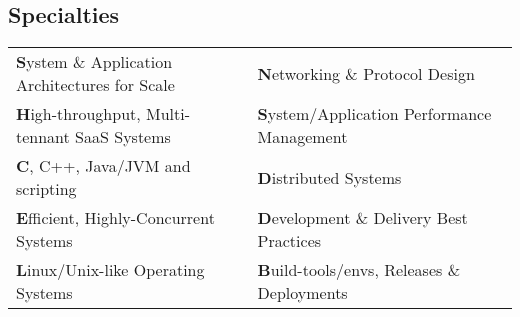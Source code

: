\documentclass[margin,line]{res}
\begin{document}
\begin{resume}
\section{\sc Specialties}
\vspace{.4cm}
\begin{tabular}{@{}p{3.3in}p{3.3in}}
{\bf S}ystem \& Application Architectures for Scale          &  {\bf N}etworking \& Protocol Design                        \\ [0.2cm]
{\bf H}igh-throughput, Multi-tennant SaaS Systems            &  {\bf S}ystem/Application Performance Management            \\ [0.2cm]
{\bf C}, C++, Java/JVM and scripting                         &  {\bf D}istributed Systems                                  \\ [0.2cm]
{\bf E}fficient, Highly-Concurrent Systems                   &  {\bf D}evelopment \& Delivery Best Practices               \\ [0.2cm]
{\bf L}inux/Unix-like Operating Systems                      &  {\bf B}uild-tools/envs, Releases \& Deployments
\end{tabular}


\end{resume}
\end{document}
